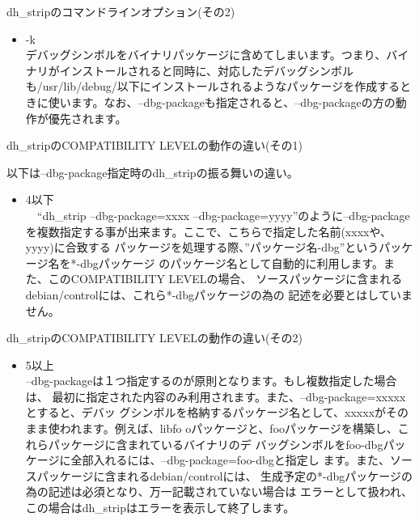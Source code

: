 \begin{frame}{dh\_stripのコマンドラインオプション(その2)}
\begin{itemize}
\item -k \\
デバッグシンボルをバイナリパッケージに含めてしまいます。つまり、バイナリがインストールされると同時に、対応したデバッグシンボルも/usr/lib/debug/以下にインストールされるようなパッケージを作成するときに使います。なお、--dbg-packageも指定されると、--dbg-packageの方の動作が優先されます。
\end{itemize}

\end{frame}

\begin{frame}{dh\_stripのCOMPATIBILITY LEVELの動作の違い(その1)}

以下は--dbg-package指定時のdh\_stripの振る舞いの違い。

\begin{itemize}
\item 4以下\\
　``dh\_strip --dbg-package=xxxx --dbg-package=yyyy''のように--dbg-package
を複数指定する事が出来ます。ここで、こちらで指定した名前(xxxxや、yyyy)に合致する
パッケージを処理する際、''パッケージ名-dbg''というパッケージ名を*-dbgパッケージ
のパッケージ名として自動的に利用します。また、このCOMPATIBILITY LEVELの場合、
ソースパッケージに含まれるdebian/controlには、これら*-dbgパッケージの為の
記述を必要とはしていません。
\end{itemize}

\end{frame}

\begin{frame}{dh\_stripのCOMPATIBILITY LEVELの動作の違い(その2)}

\begin{itemize}
\item 5以上\\
--dbg-packageは１つ指定するのが原則となります。もし複数指定した場合は、
最初に指定された内容のみ利用されます。また、--dbg-package=xxxxxとすると、デバッ
グシンボルを格納するパッケージ名として、xxxxxがそのまま使われます。例えば、libfo
oパッケージと、fooパッケージを構築し、これらパッケージに含まれているバイナリのデ
バッグシンボルをfoo-dbgパッケージに全部入れるには、--dbg-package=foo-dbgと指定し
ます。また、ソースパッケージに含まれるdebian/controlには、
生成予定の*-dbgパッケージの為の記述は必須となり、万一記載されていない場合は
エラーとして扱われ、この場合はdh\_stripはエラーを表示して終了します。
\end{itemize}

\end{frame}

